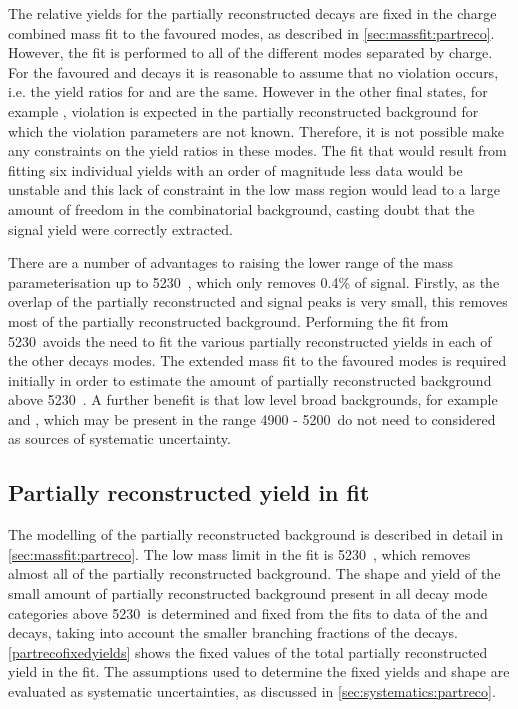 The relative yields for the partially reconstructed decays are fixed in the charge combined mass fit to the favoured modes, as described in \sect\ref{sec:massfit:partreco}. However, the \CP fit is performed to all of the different \Dz modes separated by \B charge. For the favoured \kpi and \kpipipi decays it is reasonable to assume that no \CP violation occurs, i.e. the yield ratios for \Bm and \Bp are the same. However in the other \Dz final states, for example \pik, \CP violation is expected in the partially reconstructed background for which the \CP violation parameters are not known. Therefore, it is not possible make any constraints on the yield ratios in these modes. The fit that would result from fitting six individual yields with an order of magnitude less data would be unstable and this lack of constraint in the low mass region would lead to a large amount of freedom in the combinatorial background, casting doubt that the signal yield were correctly extracted. 

There are a number of advantages to raising the lower range of the mass parameterisation up to 5230~\mevcc, which only removes 0.4\% of signal. Firstly, as the overlap of the partially reconstructed and signal peaks is very small, this removes most of the partially reconstructed background. Performing the \CP fit from 5230~\mevcc avoids the need to fit the various partially reconstructed yields in each of the other \Dz decays modes. The extended mass fit to the favoured modes is required initially in order to estimate the amount of partially reconstructed background above 5230~\mevcc. A further benefit is that low level broad backgrounds, for example \decay{\Bm}{\D\Kstarm\piz} and \decay{\Bd}{\Kp\pim\pip\pim}, which may be present in the range 4900 - 5200~\mevcc do not need to considered as sources of systematic uncertainty. 

\subsection{Partially reconstructed yield in \CP fit}
\label{sec:cpfit:partrecoyields}

The modelling of the partially reconstructed background is described in detail in \sect\ref{sec:massfit:partreco}. The low mass limit in the \CP fit is 5230~\mevcc, which removes almost all of the partially reconstructed background. The shape and yield of the small amount of partially reconstructed background present in all \Dz decay mode categories above 5230~\mevcc is determined and fixed from the fits to data of the \kpi and \kpipipi decays, taking into account the smaller branching fractions of the \Dz decays. \Tab\ref{partrecofixedyields} shows the fixed values of the total partially reconstructed yield in the \CP fit. The assumptions used to determine the fixed yields and shape are evaluated as systematic uncertainties, as discussed in \sect\ref{sec:systematics:partreco}. 

